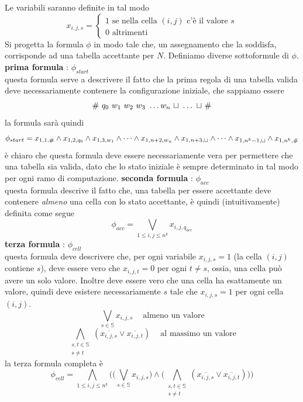 \documentclass[10pt, letterpaper]{report}
\begin{document}
Le variabili saranno definite in tal modo $$x_{i,j,s}=\begin{cases}
    1 \text{ se nella cella $(i,j)$ c'è il valore }s \\ 
    0 \text{ altrimenti }
\end{cases} $$
Si progetta la formula $\phi$ in modo tale che, un assegnamento che la soddisfa, corrisponde ad una tabella accettante per $N$. Definiamo diverse sottoformule di $\phi$.\acc 
\textbf{prima formula} : $\phi_{start}$\\
questa formula serve a descrivere il fatto che la prima regola di una tabella valida deve necessariamente contenere la configurazione iniziale, che sappiamo essere 
$$ \# \  q_0 \ w_1 \ w_2 \ w_3 \ \dots w_n \ \blank \ \dots \ \blank \ \#$$
la formula sarà quindi 
$$ 
\phi_{start}=x_{1,1,\#}\land x_{1,2,q_0}\land x_{1,3,w_1} \land \dots \land  
x_{1,n+2,w_n}\land x_{1,n+3,{\sqcup} }\land \dots \land  
x_{1,n^k-1,{\sqcup} }\land x_{1,n^k,\#}
$$
è chiaro che questa formula deve essere necessariamente vera per permettere che una tabella sia valida, dato che lo stato iniziale è sempre determinato in tal modo per ogni ramo di computazione.\acc
\textbf{seconda formula} : $\phi_{acc}$\\ 
questa formula descrive il fatto che, una tabella per essere accettante deve contenere \textit{almeno} una cella con lo stato accettante, è quindi (intuitivamente) definita come segue $$ 
\phi_{acc}=\bigvee_{1 \leq i,j \leq n^k} x_{i,j,q_{acc}}$$
\textbf{terza formula} : $\phi_{cell}$\\
questa formula deve descrivere che, per ogni variabile $x_{i,j,s}=1$ (la cella $(i,j)$ contiene $s$), deve essere vero che $x_{i,j,t}=0$ per ogni $t\ne s$, ossia, una cella può avere un solo valore. Inoltre deve essere vero che una cella ha esattamente un valore, quindi deve esistere necessariamente $s$ tale che $x_{i,j,s}=1$ per ogni cella $(i,j)$. 
$$\bigvee_{s\in\mathbb S} x_{i,j,s} \ \ \ \   \text{ almeno un valore}$$
$$ \bigwedge\limits_{\begin{matrix}s,t\in\mathbb{S}\\ s\ne t\end{matrix}}
(\overline{x_{i,j,s}}\lor \overline{x_{i,j,t}})\ \ \ \   \text{ al massimo un valore}$$
la terza formula completa è 
$$ \phi_{cell}=\bigwedge\limits_{1 \leq i,j \leq n^k} \Big(
    \Big(\bigvee_{s\in\mathbb S} x_{i,j,s}\Big) \land
    \Big(\bigwedge\limits_{\begin{matrix}s,t\in\mathbb{S}\\ s\ne t\end{matrix}}
    (\overline{x_{i,j,s}}\lor \overline{x_{i,j,t}})\Big) 
\Big)$$
\end{document}
